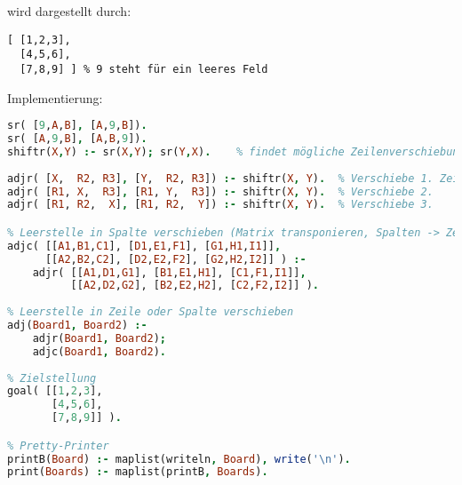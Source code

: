 wird dargestellt durch:
\begin{lstlisting}
[ [1,2,3], 
  [4,5,6], 
  [7,8,9] ]	% 9 steht für ein leeres Feld
\end{lstlisting}
Implementierung:
\begin{lstlisting}[language=Prolog]
% Leerstelle in Zeile verschieben
sr( [9,A,B], [A,9,B]).
sr( [A,9,B], [A,B,9]).
shiftr(X,Y) :- sr(X,Y); sr(Y,X).	% findet mögliche Zeilenverschiebungen.
 
adjr( [X,  R2, R3], [Y,  R2, R3]) :- shiftr(X, Y).	% Verschiebe 1. Zeile, wenn sie Leerstelle enthält.
adjr( [R1, X,  R3], [R1, Y,  R3]) :- shiftr(X, Y).	% Verschiebe 2.
adjr( [R1, R2,  X], [R1, R2,  Y]) :- shiftr(X, Y).	% Verschiebe 3.

% Leerstelle in Spalte verschieben (Matrix transponieren, Spalten -> Zeilen. Damit Zeilenverschiebung durchführen)
adjc( [[A1,B1,C1], [D1,E1,F1], [G1,H1,I1]], 
      [[A2,B2,C2], [D2,E2,F2], [G2,H2,I2]] ) :-
	adjr( [[A1,D1,G1], [B1,E1,H1], [C1,F1,I1]],
	      [[A2,D2,G2], [B2,E2,H2], [C2,F2,I2]] ).  
 
% Leerstelle in Zeile oder Spalte verschieben
adj(Board1, Board2) :-
	adjr(Board1, Board2);
	adjc(Board1, Board2).
	
% Zielstellung
goal( [[1,2,3],
       [4,5,6],
       [7,8,9]] ).

% Pretty-Printer
printB(Board) :- maplist(writeln, Board), write('\n').
print(Boards) :- maplist(printB, Boards).
\end{lstlisting}







